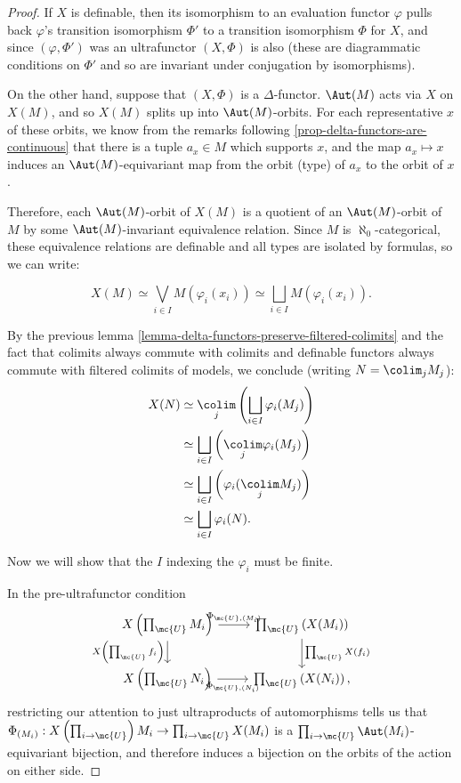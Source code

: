 \begin{proof}
  If $X$ is definable, then its isomorphism to an evaluation functor $\varphi$ pulls back $\varphi$'s transition isomorphism $\Phi'$ to a transition isomorphism $\Phi$ for $X$, and since $(\varphi, \Phi')$ was an ultrafunctor $(X, \Phi)$ is also (these are diagrammatic conditions on $\Phi'$ and so are invariant under conjugation by isomorphisms).

  On the other hand, suppose that $(X, \Phi)$ is a $\Delta$-functor. $\Aut(M)$ acts via $X$ on $X(M)$, and so $X(M)$ splits up into $\Aut(M)$-orbits. For each representative $x$ of these orbits, we know from the remarks following \ref{prop-delta-functors-are-continuous} that there is a tuple $a_x \in M$ which supports $x$, and the map $a_x \mapsto x$ induces an $\Aut(M)$-equivariant map from the orbit (type) of $a_x$ to the orbit of $x$.

  Therefore, each $\Aut(M)$-orbit of $X(M)$ is a quotient of an $\Aut(M)$-orbit of $M$ by some $\Aut(M)$-invariant equivalence relation. Since $M$ is $\aleph_0$-categorical, these equivalence relations are definable and all types are isolated by formulas, so we can write:

  $$X(M) \simeq \bigvee_{i \in I} M(\varphi_i(x_i)) \simeq \bigsqcup_{i \in I} M(\varphi_i(x_i)).$$

    By the previous lemma \ref{lemma-delta-functors-preserve-filtered-colimits} and the fact that colimits always commute with colimits and definable functors always commute with filtered colimits of models, we conclude (writing $N = \colim_j M_j$):
    \begin{align}
    X(N)  &\simeq \underset{j}{\colim} \left(\bigsqcup_{i \in I} \varphi_i(M_j) \right)\\
          &\simeq \bigsqcup_{i \in I} \left(\underset{j}{\colim} \varphi_i(M_j)\right) \\
          &\simeq \bigsqcup_{i \in I} \left( \varphi_i( \underset{j}{\colim} M_j) \right)\\
      &\simeq \bigsqcup_{i \in I} \varphi_i(N).
      \end{align}

      Now we will show that the $I$ indexing the $\varphi_i$ must be finite.

In the pre-ultrafunctor condition
      $$\begin{tikzcd}[ampersand replacement = \&]
X\left(\prod_{\mc{U}} M_i\right) \arrow[swap]{d}{X\left(\prod_{\mc{U}} f_i \right)} \arrow{r}{\Phi_{\mc{U}, (M_i)}}  \& \prod_{\mc{U}} \left( X(M_i) \right) \arrow{d}{\prod_{\mc{U}} X(f_i)}\\
X\left(\prod_{\mc{U}} N_i\right) \arrow[swap]{r}{\Phi_{\mc{U}, (N_i)}} \& \prod_{\mc{U}} \left( X(N_i)\right),
\end{tikzcd}$$
restricting our attention to just ultraproducts of automorphisms tells us that $\Phi_{(M_i)} : X\left(\prod_{i \to \mc{U}}\right) M_i \to \prod_{i \to \mc{U}} X(M_i)$ is a $\prod_{i \to \mc{U}} \Aut(M_i)$-equivariant bijection, and therefore induces a bijection on the orbits of the action on either side.


\end{proof}
